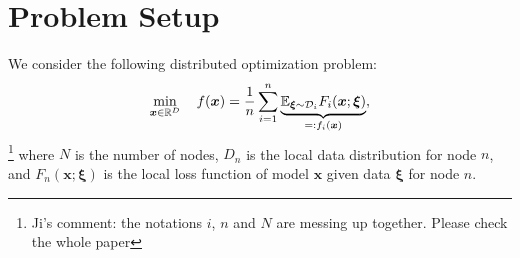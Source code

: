 \documentclass{article}
\def\rc{\color{red}}
\newcounter{ass_counter}
\newcounter{thm_counter}
\begin{document}
%
%
%
%
%
%
\section{Problem Setup}

We consider the following distributed optimization problem:
\begin{equation}
\min_{\bm{x}\in\mathbb{R}^{D}}\quad f(\bm{x}) = {1\over n} \sum_{i=1}^n \underbrace{\mathbb{E}_{\bm{\bm{\xi}}\sim\mathcal{D}_i}F_{i}(\bm{x}; \bm{\bm{\xi}})}_{=: f_i(\bm{x})},\label{eq:main}
\end{equation}
\footnote{\rc Ji's comment: the notations $i$, $n$ and $N$ are messing up together. Please check the whole paper}
where $N$ is the number of nodes, $D_n$ is the local data distribution for node $n$, and $F_n(\bm{x}; \bm{\bm{\xi}} )$ is the local loss function of model $\bm{x}$ given data $\bm{\bm{\xi}}$ for node $n$.
\end{document}
